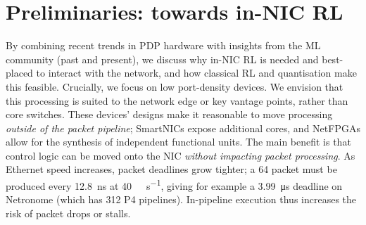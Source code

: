 \documentclass[
conference
,10pt
]{IEEEtran}
\begin{document}
%

\section{Preliminaries: towards in-NIC RL}\label{sec:motivation}
By combining recent trends in PDP hardware with insights from the ML community (past and present), we discuss why in-NIC RL is needed and best-placed to interact with the network, and how classical RL and quantisation make this feasible.
Crucially, we focus on low port-density devices.
We envision that this processing is suited to the network edge or key vantage points, rather than core switches.
These devices' designs make it reasonable to move processing \emph{outside of the packet pipeline}; SmartNICs expose additional cores, and NetFPGAs allow for the synthesis of independent functional units.
The main benefit is that control logic can be moved onto the NIC \emph{without impacting packet processing}.
As Ethernet speed increases, packet deadlines grow tighter; a \SI{64}{\byte} packet must be produced every \SI{12.8}{\nano\second} at \SI{40}{\giga\bit\per\second}, giving for example a \SI{3.99}{\micro\second} deadline on Netronome (which has \num{312} P4 pipelines).
In-pipeline execution thus increases the risk of packet drops or stalls.

\end{document}
